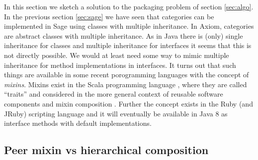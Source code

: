 \documentclass{llncs}
\begin{document}

In this section we sketch a solution to the packaging problem of
section \ref{sec:algo}.  In the previous section \ref{sec:sage} we
have seen that categories can be implemented in Sage using classes
with multiple inheritance. In Axiom, categories are abstract classes
with multiple inheritance.  As in Java there is (only) single
inheritance for classes and multiple inheritance for interfaces it
seems that this is not directly possible.
%
%
We would at least need some way to mimic multiple inheritance for
method implementations in interfaces. It turns out that such things
are available in some recent porogramming languages with the concept
of {\em mixins}. Mixins exist in the Scala programming language
\cite{Odersky:2003}, where they are called ``traits'' and considered
in the more general context of reusable software components and mixin
composition \cite{Odersky:2005}. Further the concept exists in the
Ruby (and JRuby) \cite{Matsumo:1995} scripting language and it will
eventually be available in Java 8 as interface methods with default
implementations.


\subsection{Peer mixin vs hierarchical composition} %
\end{document}
